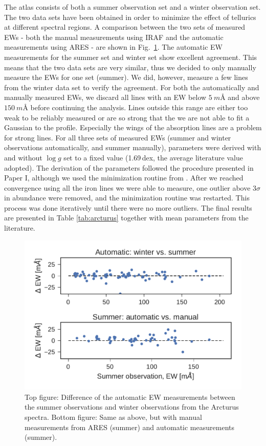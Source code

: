 \documentclass{aa}
\begin{document}
The atlas consists of both a summer observation set and a winter observation
set. The two data sets have been obtained in order to minimize the effect of
tellurics at different spectral regions. A comparison between the two sets of
measured EWs - both the manual measurements using IRAF and the automatic
measurements using ARES - are shown in Fig.~\ref{fig:EWcomp}. The automatic EW
measurements for the summer set and winter set show excellent agreement. This
means that the two data sets are very similar, thus we decided to only manually
measure the EWs for one set (summer). We did, however, measure a few lines from
the winter data set to verify the agreement. For both the automatically and
manually measured EWs, we discard all lines with an EW below $\SI{5}{m}$\AA{}
and above $\SI{150}{m}$\AA{} before continuing the analysis. Lines outside this
range are either too weak to be reliably measured or are so strong that the we
are not able to fit a Gaussian to the profile. Especially the wings of the
absorption lines are a problem for strong lines. For all three sets of measured
EWs (summer and winter observations automatically, and summer manually),
parameters were derived with and without $\log g$ set to a fixed value
(1.69\,dex, the average literature value adopted). The derivation of the
parameters followed the procedure presented in Paper I, although we used the
minimization routine from \citet{Andreasen2017a}. After we reached convergence
using all the iron lines we were able to measure, one outlier above $3\sigma$ in
abundance were removed, and the minimization routine was restarted. This process
was done iteratively until there were no more outliers. The final results are
presented in Table \ref{tab:arcturus} together with mean parameters from the
literature.


\begin{figure}[htpb!]
    \centering
    \includegraphics[width=1.0\linewidth]{figures/EWcomp.pdf}
    \caption{Top figure: Difference of the automatic EW measurements between the
             summer observations and winter observations from the Arcturus
             spectra. Bottom figure: Same as above, but with manual measurements
             from ARES (summer) and automatic measurements (summer).}
    \label{fig:EWcomp}
\end{figure}
\end{document}

